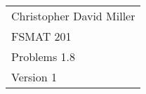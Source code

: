 \documentclass[12pt]{article}
\begin{document}
\newtheorem{prop}{Proposition}

\begin{flushright}
\begin{tabular}{l}
Christopher David Miller \\  %
FSMAT 201 \\  %
Problems 1.8 \\  %
Version 1 \\ %
\end{tabular}
\end{flushright}
\vspace{20pt}  %

\end{document}
